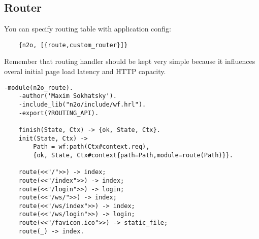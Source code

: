 \newpage
\subsection{Router}
You can specify routing table with application config:

\vspace{1\baselineskip}
\begin{lstlisting}
    {n2o, [{route,custom_router}]}
\end{lstlisting}
\vspace{1\baselineskip}

Remember that routing handler should be kept very simple because it
influences overal initial page load latency and HTTP capacity.

\vspace{1\baselineskip}
\begin{lstlisting}[caption=n2o\_route.erl]
    -module(n2o_route).
    -author('Maxim Sokhatsky').
    -include_lib("n2o/include/wf.hrl").
    -export(?ROUTING_API).

    finish(State, Ctx) -> {ok, State, Ctx}.
    init(State, Ctx) -> 
        Path = wf:path(Ctx#context.req),
        {ok, State, Ctx#context{path=Path,module=route(Path)}}.

    route(<<"/">>) -> index;
    route(<<"/index">>) -> index;
    route(<<"/login">>) -> login;
    route(<<"/ws/">>) -> index;
    route(<<"/ws/index">>) -> index;
    route(<<"/ws/login">>) -> login;
    route(<<"/favicon.ico">>) -> static_file;
    route(_) -> index.
\end{lstlisting}
